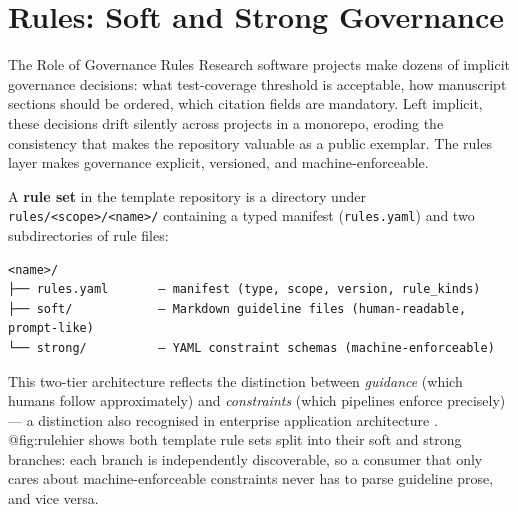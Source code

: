 \documentclass[
  ignorenonframetext,
]{beamer}
\author{\texorpdfstring{}{}}
\date{}
\begin{document}
\section{Rules: Soft and Strong Governance}\label{sec:rules}

\begin{frame}{The Role of Governance Rules}
\protect{}\label{the-role-of-governance-rules}
Research software projects make dozens of implicit governance decisions:
what test-coverage threshold is acceptable, how manuscript sections
should be ordered, which citation fields are mandatory. Left implicit,
these decisions drift silently across projects in a monorepo, eroding
the consistency that makes the repository valuable as a public exemplar.
The rules layer makes governance explicit, versioned, and
machine-enforceable.

A \textbf{rule set} in the template repository is a directory under
\texttt{rules/\textless{}scope\textgreater{}/\textless{}name\textgreater{}/}
containing a typed manifest (\texttt{rules.yaml}) and two subdirectories
of rule files:

\begin{verbatim}
<name>/
├── rules.yaml       — manifest (type, scope, version, rule_kinds)
├── soft/            — Markdown guideline files (human-readable, prompt-like)
└── strong/          — YAML constraint schemas (machine-enforceable)
\end{verbatim}

This two-tier architecture reflects the distinction between
\emph{guidance} (which humans follow approximately) and
\emph{constraints} (which pipelines enforce precisely) --- a distinction
also recognised in enterprise application architecture
. @fig:rulehier shows both template rule sets
split into their soft and strong branches: each branch is independently
discoverable, so a consumer that only cares about machine-enforceable
constraints never has to parse guideline prose, and vice versa.
\end{frame}
\end{document}
